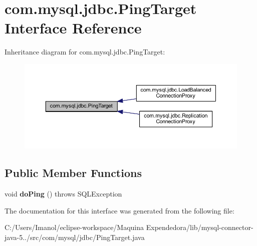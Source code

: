 \hypertarget{interfacecom_1_1mysql_1_1jdbc_1_1_ping_target}{}\section{com.\+mysql.\+jdbc.\+Ping\+Target Interface Reference}
\label{interfacecom_1_1mysql_1_1jdbc_1_1_ping_target}


Inheritance diagram for com.\+mysql.\+jdbc.\+Ping\+Target\+:
\nopagebreak
\begin{figure}[H]
\begin{center}
\leavevmode
\includegraphics[width=350pt]{interfacecom_1_1mysql_1_1jdbc_1_1_ping_target__inherit__graph}
\end{center}
\end{figure}
\subsection*{Public Member Functions}
\begin{DoxyCompactItemize}
\item 
\mbox{\label{interfacecom_1_1mysql_1_1jdbc_1_1_ping_target_afb311ca61637655e6749c7181f2c0137}} 
void {\bfseries do\+Ping} ()  throws S\+Q\+L\+Exception
\end{DoxyCompactItemize}


The documentation for this interface was generated from the following file\+:\begin{DoxyCompactItemize}
\item 
C\+:/\+Users/\+Imanol/eclipse-\/workspace/\+Maquina Expendedora/lib/mysql-\/connector-\/java-\/5../src/com/mysql/jdbc/Ping\+Target.\+java\end{DoxyCompactItemize}
